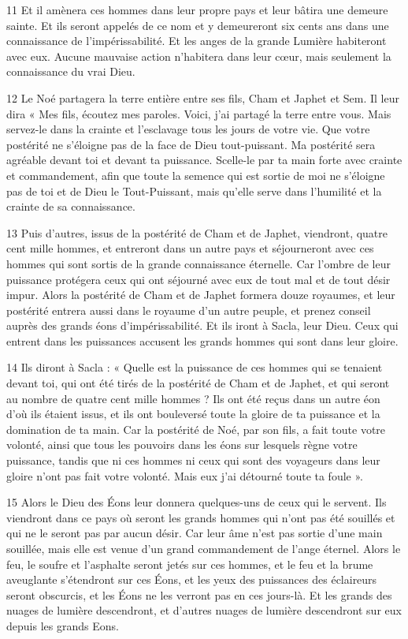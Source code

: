 \par 11 Et il amènera ces hommes dans leur propre pays et leur bâtira une demeure sainte. Et ils seront appelés de ce nom et y demeureront six cents ans dans une connaissance de l'impérissabilité. Et les anges de la grande Lumière habiteront avec eux. Aucune mauvaise action n'habitera dans leur cœur, mais seulement la connaissance du vrai Dieu.

\par 12 Le Noé partagera la terre entière entre ses fils, Cham et Japhet et Sem. Il leur dira « Mes fils, écoutez mes paroles. Voici, j'ai partagé la terre entre vous. Mais servez-le dans la crainte et l'esclavage tous les jours de votre vie. Que votre postérité ne s'éloigne pas de la face de Dieu tout-puissant. Ma postérité sera agréable devant toi et devant ta puissance. Scelle-le par ta main forte avec crainte et commandement, afin que toute la semence qui est sortie de moi ne s'éloigne pas de toi et de Dieu le Tout-Puissant, mais qu'elle serve dans l'humilité et la crainte de sa connaissance.

\par 13 Puis d'autres, issus de la postérité de Cham et de Japhet, viendront, quatre cent mille hommes, et entreront dans un autre pays et séjourneront avec ces hommes qui sont sortis de la grande connaissance éternelle. Car l'ombre de leur puissance protégera ceux qui ont séjourné avec eux de tout mal et de tout désir impur. Alors la postérité de Cham et de Japhet formera douze royaumes, et leur postérité entrera aussi dans le royaume d'un autre peuple, et prenez conseil auprès des grands éons d'impérissabilité. Et ils iront à Sacla, leur Dieu. Ceux qui entrent dans les puissances accusent les grands hommes qui sont dans leur gloire.

\par 14 Ils diront à Sacla : « Quelle est la puissance de ces hommes qui se tenaient devant toi, qui ont été tirés de la postérité de Cham et de Japhet, et qui seront au nombre de quatre cent mille hommes ? Ils ont été reçus dans un autre éon d’où ils étaient issus, et ils ont bouleversé toute la gloire de ta puissance et la domination de ta main. Car la postérité de Noé, par son fils, a fait toute votre volonté, ainsi que tous les pouvoirs dans les éons sur lesquels règne votre puissance, tandis que ni ces hommes ni ceux qui sont des voyageurs dans leur gloire n'ont pas fait votre volonté. Mais eux j’ai détourné toute ta foule ».

\par 15 Alors le Dieu des Éons leur donnera quelques-uns de ceux qui le servent. Ils viendront dans ce pays où seront les grands hommes qui n'ont pas été souillés et qui ne le seront pas par aucun désir. Car leur âme n'est pas sortie d'une main souillée, mais elle est venue d'un grand commandement de l'ange éternel. Alors le feu, le soufre et l'asphalte seront jetés sur ces hommes, et le feu et la brume aveuglante s'étendront sur ces Éons, et les yeux des puissances des éclaireurs seront obscurcis, et les Éons ne les verront pas en ces jours-là. Et les grands des nuages ​​de lumière descendront, et d’autres nuages ​​de lumière descendront sur eux depuis les grands Eons.

